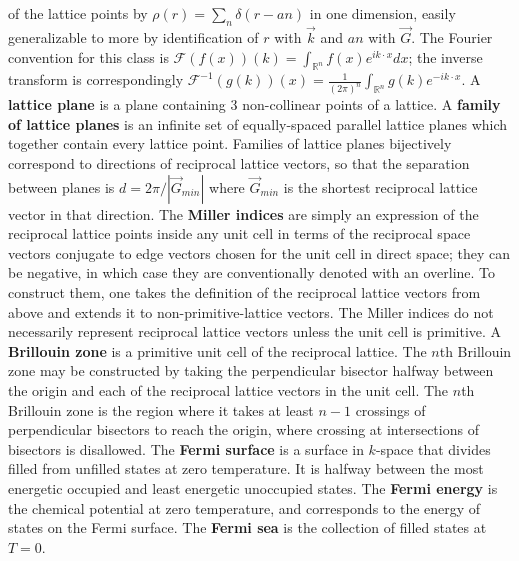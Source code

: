 \documentclass[10pt]{article}
\begin{document}
of the lattice points by $\rho(r)=\sum_{n}\delta(r-an)$ in one dimension,
easily generalizable to more by identification of $r$ with $\vec{k}$ and $an$ with $\vec{G}$.
The Fourier convention for this class is
$\mathcal{F}(f(x))(k)=\int_{\mathbb{R}^{n}}f(x)e^{ik\cdot x}dx$;
the inverse transform is correspondingly
$\mathcal{F}^{-1}(g(k))(x)=\frac{1}{(2\pi)^{n}}\int_{\mathbb{R}^{n}}g(k)e^{-ik\cdot x}$.
A \textbf{lattice plane} is a plane containing 3 non-collinear points of a lattice.
A \textbf{family of lattice planes} is an infinite set of equally-spaced parallel lattice planes which together contain
every lattice point.
Families of lattice planes bijectively correspond to directions of reciprocal lattice vectors,
so that the separation between planes is $d=2\pi/|\vec{G}_{min}|$ where $\vec{G}_{min}$ is the shortest reciprocal lattice vector
in that direction.
The \textbf{Miller indices} are simply an expression of the reciprocal lattice points inside any unit cell in terms of the reciprocal
space vectors conjugate to edge vectors chosen for the unit cell in direct space;
they can be negative, in which case they are conventionally denoted with an overline.
To construct them, one takes the definition of the reciprocal lattice vectors from above and extends it to non-primitive-lattice
vectors.
The Miller indices do not necessarily represent reciprocal lattice vectors unless the unit cell is primitive.
A \textbf{Brillouin zone} is a primitive unit cell of the reciprocal lattice.
The $n$th Brillouin zone may be constructed by taking the perpendicular bisector halfway between the origin and each of the
reciprocal lattice vectors in the unit cell.
The $n$th Brillouin zone is the region where it takes at least $n-1$ crossings of perpendicular bisectors to reach the origin,
where crossing at intersections of bisectors is disallowed.
The \textbf{Fermi surface} is a surface in $k$-space that divides filled from unfilled states at zero temperature.
It is halfway between the most energetic occupied and least energetic unoccupied states.
The \textbf{Fermi energy} is the chemical potential at zero temperature, and corresponds to the energy of states on the Fermi surface.
The \textbf{Fermi sea} is the collection of filled states at $T=0$.
\end{document}
